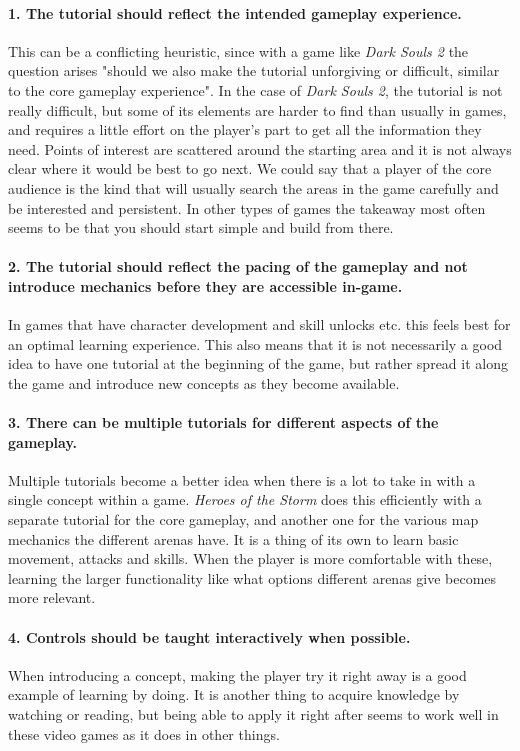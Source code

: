 \paragraph{1. The tutorial should reflect the intended gameplay experience.} 
This can be a conflicting heuristic, since with a game like \textit{Dark Souls 2} the question arises "should we also make the tutorial unforgiving or difficult, similar to the core gameplay experience". In the case of \textit{Dark Souls 2}, the tutorial is not really difficult, but some of its elements are harder to find than usually in games, and requires a little effort on the player's part to get all the information they need. Points of interest are scattered around the starting area and it is not always clear where it would be best to go next. We could say that a player of the core audience is the kind that will usually search the areas in the game carefully and be interested and persistent. In other types of games the takeaway most often seems to be that you should start simple and build from there.
\paragraph{2. The tutorial should reflect the pacing of the gameplay and not introduce mechanics before they are accessible in-game.}
In games that have character development and skill unlocks etc. this feels best for an optimal learning experience. This also means that it is not necessarily a good idea to have one tutorial at the beginning of the game, but rather spread it along the game and introduce new concepts as they become available.
\paragraph{3. There can be multiple tutorials for different aspects of the gameplay.}
Multiple tutorials become a better idea when there is a lot to take in with a single concept within a game. \textit{Heroes of the Storm} does this efficiently with a separate tutorial for the core gameplay, and another one for the various map mechanics the different arenas have. It is a thing of its own to learn basic movement, attacks and skills. When the player is more comfortable with these, learning the larger functionality like what options different arenas give becomes more relevant.
\paragraph{4. Controls should be taught interactively when possible.}
When introducing a concept, making the player try it right away is a good example of learning by doing. It is another thing to acquire knowledge by watching or reading, but being able to apply it right after seems to work well in these video games as it does in other things.
